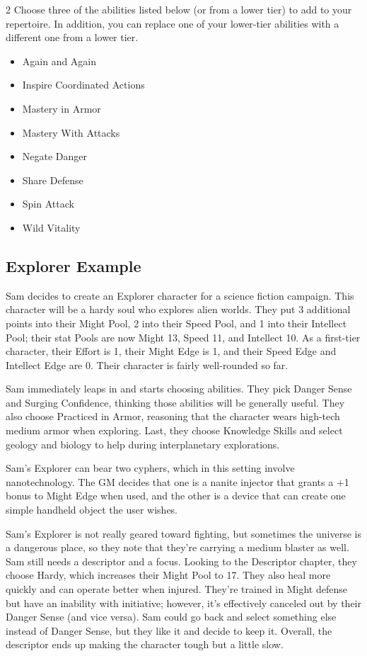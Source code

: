 \begin{multicols}{2}
Choose three of the abilities listed below (or from a lower tier) to add to your repertoire. In addition, you can replace one of your lower-tier abilities with a different one from a lower tier.

\begin{itemize}
\item Again and Again
\item Inspire Coordinated Actions
\item Mastery in Armor
\item Mastery With Attacks
\item Negate Danger
\item Share Defense
\item Spin Attack
\item Wild Vitality
\end{itemize}

\subsection{Explorer Example}

Sam decides to create an Explorer character for a science fiction campaign. This character will be a hardy soul who explores alien worlds. They put 3 additional points into their Might Pool, 2 into their Speed Pool, and 1 into their Intellect Pool; their stat Pools are now Might 13, Speed 11, and Intellect 10. As a first-tier character, their Effort is 1, their Might Edge is 1, and their Speed Edge and Intellect Edge are 0. Their character is fairly well-rounded so far.

Sam immediately leaps in and starts choosing abilities. They pick Danger Sense and Surging Confidence, thinking those abilities will be generally useful. They also choose Practiced in Armor, reasoning that the character wears high-tech medium armor when exploring. Last, they choose Knowledge Skills and select geology and biology to help during interplanetary explorations. 

Sam’s Explorer can bear two cyphers, which in this setting involve nanotechnology. The GM decides that one is a nanite injector that grants a +1 bonus to Might Edge when used, and the other is a device that can create one simple handheld object the user wishes. 

Sam’s Explorer is not really geared toward fighting, but sometimes the universe is a dangerous place, so they note that they’re carrying a medium blaster as well.
Sam still needs a descriptor and a focus. Looking to the Descriptor chapter, they choose Hardy, which increases their Might Pool to 17. They also heal more quickly and can operate better when injured. They’re trained in Might defense but have an inability with initiative; however, it’s effectively canceled out by their Danger Sense (and vice versa). Sam could go back and select something else instead of Danger Sense, but they like it and decide to keep it. Overall, the descriptor ends up making the character tough but a little slow.


\end{multicols}

